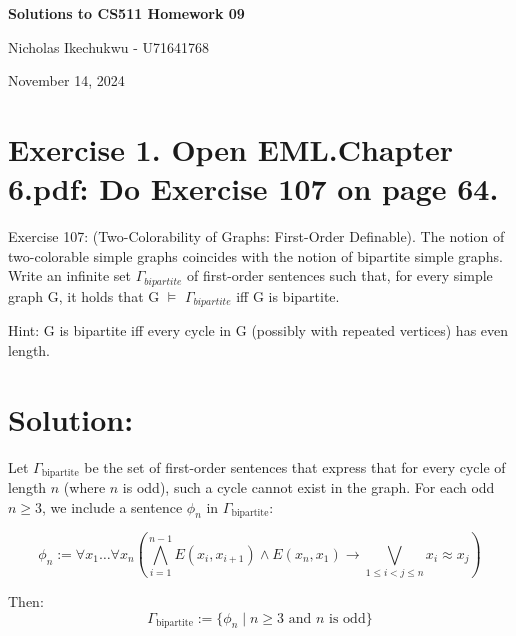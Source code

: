 \documentclass{article}
\begin{document}
\begin{center}
    \Large\textbf{Solutions to CS511 Homework 09}
    
    \vspace{0.5cm}
    
    \large Nicholas Ikechukwu - U71641768
    
    \vspace{0.3cm}
    
    \large November 14, 2024
\end{center}



\section*{Exercise 1. Open EML.Chapter 6.pdf: Do Exercise 107 on page 64. }


\begin{mdframed}
    Exercise 107: (Two-Colorability of Graphs: First-Order Deﬁnable). The notion of two-colorable
    simple graphs coincides with the notion of bipartite simple graphs. Write an inﬁnite set $\Gamma_{bipartite}$
    of ﬁrst-order sentences such that, for every simple graph G, it holds that G $\models$ $\Gamma_{bipartite}$ iﬀ G is
    bipartite.

    \vspace{1em} 
    Hint: G is bipartite iﬀ every cycle in G (possibly with repeated vertices) has even length. 
\end{mdframed}
\section*{Solution:}
Let $\Gamma_{\text{bipartite}}$ be the set of first-order sentences that express that for every cycle of length $n$ (where $n$ is odd), such a cycle cannot exist in the graph. For each odd $n \geq 3$, we include a sentence $\phi_n$ in $\Gamma_{\text{bipartite}}$:
    
    \[
    \phi_n := \forall x_1 \ldots \forall x_n \left(\bigwedge_{i=1}^{n-1} E(x_i,x_{i+1}) \land E(x_n,x_1) \rightarrow \bigvee_{1 \leq i < j \leq n} x_i \approx x_j\right)
    \]
    
    Then:
    \[
    \Gamma_{\text{bipartite}} := \{\phi_n \mid n \geq 3 \text{ and } n \text{ is odd}\}
    \]
    
\end{document}
